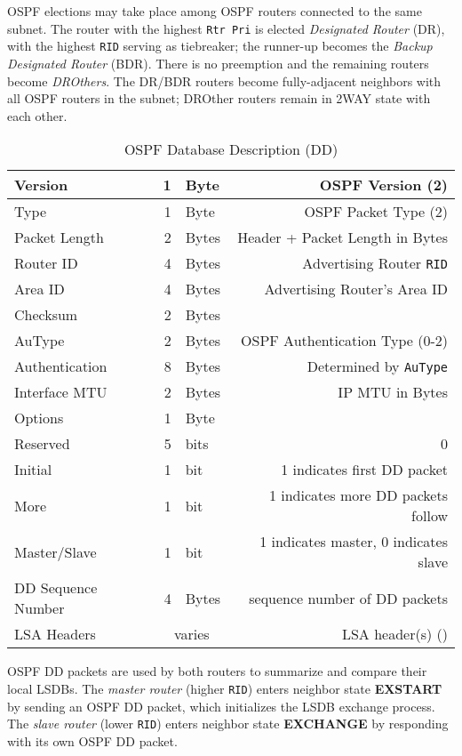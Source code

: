 \documentclass[12pt]{article}
\newcommand{\mc}[3]{\multicolumn{#1}{#2}{#3}}
\begin{document}
	OSPF elections may take place among OSPF routers connected to the same subnet. The router with the highest \texttt{Rtr Pri} is elected \textit{Designated Router} (DR), with the highest \texttt{RID} serving as tiebreaker; the runner-up becomes the \textit{Backup Designated Router} (BDR). There is no preemption and the remaining routers become \textit{DROthers}. The DR/BDR routers become fully-adjacent neighbors with all OSPF routers in the subnet; DROther routers remain in 2WAY state with each other.

	\begin{table}[H]
	\centering
	\caption{OSPF Database Description (DD) \label{tab:OSPF DD}}
	\begin{tabular}{| l | r @{ } l | r |}\hline
	Version			& 1	& Byte		& OSPF Version (2)\\\hline
	Type				& 1	& Byte		& OSPF Packet Type (2)\\\hline
	Packet Length		& 2	& Bytes		& Header + Packet Length in Bytes\\\hline
	Router ID			& 4	& Bytes		& Advertising Router \texttt{RID}\\\hline
	Area ID			& 4	& Bytes		& Advertising Router's Area ID\\\hline
	Checksum			& 2	& Bytes		&\\\hline
	AuType			& 2	& Bytes		& OSPF Authentication Type (0-2)\\\hline
	Authentication		& 8	& Bytes		& Determined by \texttt{AuType}\\\hline
	Interface MTU		& 2	& Bytes		& IP MTU in Bytes\\\hline
	Options			& 1	& Byte		&\\\hline
	Reserved			& 5	& bits		& 0\\\hline
	Initial				& 1	& bit 			& 1 indicates first DD packet\\\hline 
	More				& 1	& bit 			& 1 indicates more DD packets follow\\\hline
	Master/Slave		& 1	& bit 			& 1 indicates master, 0 indicates slave\\\hline
	DD Sequence Number	& 4	& Bytes		& sequence number of DD packets\\\hline
	LSA Headers		& \mc{2}{c|}{varies}	& LSA header(s) (\Cref{tab:OSPF LSA})\\\hline
	\end{tabular}\end{table}
	OSPF DD packets are used by both routers to summarize and compare their local LSDBs. The \textit{master router} (higher \texttt{RID}) enters neighbor state \textbf{EXSTART} by sending an OSPF DD packet, which initializes the LSDB exchange process. The \textit{slave router} (lower \texttt{RID}) enters neighbor state \textbf{EXCHANGE} by responding with its own OSPF DD packet.
\end{document}
